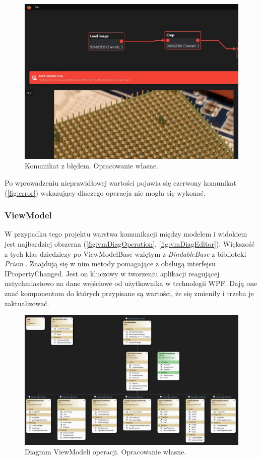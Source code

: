 \begin{figure}[H]
    \centering
    \includegraphics[width=0.8\linewidth]{images/Picture31.jpg}
    \caption{Komunikat z błędem. Opracowanie własne.}
    \label{fig:error}
\end{figure}

Po wprowadzeniu nieprawidłowej wartości pojawia się czerwony komunikat (\autoref{fig:error}) wskazujący dlaczego operacja nie mogła się wykonać.

\newpage
\subsubsection{ViewModel}

W przypadku tego projektu warstwa komunikacji między modelem i widokiem jest najbardziej obszerna (\autoref{fig:vmDiagOperation}, \autoref{fig:vmDiagEditor}). 
Większość z tych klas dziedziczy po ViewModelBase wziętym z \textit{BindableBase} \cite{prismlibraryprism} z biblioteki \textit{Prism} \cite{prismlibrary}. 
Znajdują się w nim metody pomagające z obsługą interfejsu IPropertyChanged. 
Jest on kluczowy w tworzeniu aplikacji reagującej natychmiastowo na dane wejściowe od użytkownika w technologii WPF. 
Dają one znać komponentom do których przypisane są wartości, że się zmieniły i trzeba je zaktualizować.


\begin{figure}[H]
    \centering
    \includegraphics[width=1\linewidth]{images/Picture20.jpg}
    \caption{Diagram ViewModeli operacji. Opracowanie własne.}
    \label{fig:vmDiagOperation}
\end{figure}

